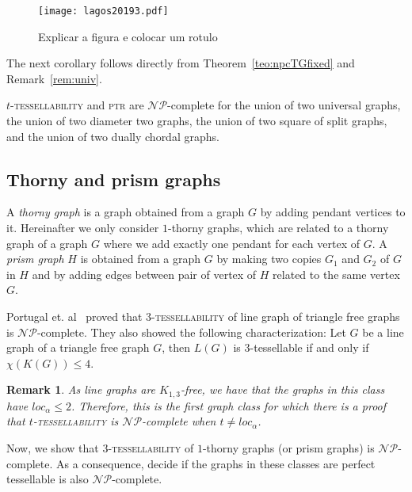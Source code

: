 \documentclass[9pt]{entcs} \usepackage{entcsmacro}
\newtheorem{rema}{Remark}[section]
\begin{document}
\begin{figure}
\centering
     \texttt{[image: lagos20193.pdf]}
     \caption{ Explicar a figura e colocar um rotulo \label{fig:fixedtg}}
\end{figure}



The next corollary follows directly from Theorem~\ref{teo:npcTGfixed} and Remark~\ref{rem:univ}.

\begin{cor}
\label{cor:trfixed}
\textsc{$t$-tessellability} and \textsc{ptr} are $\mathcal{NP}$-complete for the union of two universal graphs, the union of two diameter two graphs, the union of two square of split graphs, and the union of two dually chordal graphs.
\end{cor}




\subsection{Thorny and prism graphs}
\label{sub:34}
A \textit{thorny graph} is a graph obtained from a graph $G$ by adding pendant vertices to it.
Hereinafter we only consider $1$-thorny graphs, which are related to a thorny graph of a graph $G$ where we add exactly one pendant for each vertex of $G$.
A \textit{prism graph} $H$ is obtained from a graph $G$ by making two copies $G_1$ and $G_2$ of $G$ in $H$ and by adding edges between pair of vertex of $H$ related to the same vertex $G$.

Portugal et. al~\cite{CNMAC} proved that \textsc{$3$-tessellability} of line graph of triangle free graphs is $\mathcal{NP}$-complete. 
They also showed the following characterization:
Let $G$ be a line graph of a triangle free graph $G$, then $L(G)$ is $3$-tessellable if and only if $\chi(K(G)) \leq 4$.


\begin{rema}
\emph{
As line graphs are $K_{1,3}$-free, we have that the graphs in this class have $loc_{\alpha}\leq 2$. 
Therefore, this is the first graph class for which there is a proof that \textsc{$t$-tessellability} is $\mathcal{NP}$-complete when $t \neq loc_\alpha$.
}
\end{rema}


Now, we show that \textsc{$3$-tessellability} of $1$-thorny graphs (or prism graphs) is $\mathcal{NP}$-complete. 
As a consequence, decide if the graphs in these classes are perfect tessellable is also $\mathcal{NP}$-complete.
\end{document}
